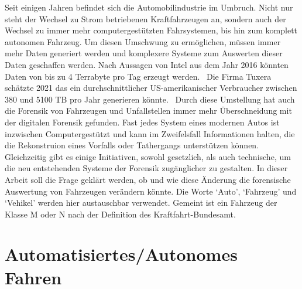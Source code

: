 \documentclass[conference,compsoc,final,a4paper]{IEEEtran}
\begin{document}
Seit einigen Jahren befindet sich die Automobilindustrie im Umbruch. Nicht nur steht der Wechsel zu Strom betriebenen Kraftfahrzeugen an,
sondern auch der Wechsel zu immer mehr computergestützten Fahrsystemen, bis hin zum komplett autonomen Fahrzeug.
Um diesen Umschwung zu ermöglichen, müssen immer mehr Daten generiert werden und komplexere Systeme zum Auswerten dieser Daten geschaffen werden.
Nach Aussagen von Intel aus dem Jahr 2016 könnten Daten von bis zu 4 Terrabyte pro Tag erzeugt werden.~\cite{Nelson2016}
Die Firma Tuxera schätzte 2021 das ein durchschnittlicher US-amerikanischer Verbraucher zwischen 380 und 5100 TB pro Jahr generieren könnte.~\cite{Wright2021}
Durch diese Umstellung hat auch die Forensik von Fahrzeugen und Unfallstellen immer mehr Überschneidung mit der digitalen Forensik gefunden.
Fast jedes System eines modernen Autos ist inzwischen Computergestützt und kann im Zweifelsfall Informationen halten, die die Rekonstruion eines Vorfalls oder Tathergangs unterstützen können.
Gleichzeitig gibt es einige Initiativen, sowohl gesetzlich\cite{Boehm2020}, als auch technische\cite{Hoque_2021a}\cite{Lee_2019}, um die neu entstehenden Systeme der Forensik zugänglicher zu gestalten.
In dieser Arbeit soll die Frage geklärt werden, ob und wie diese Änderung die forensische Auswertung von Fahrzeugen verändern könnte.
Die Worte `Auto', `Fahrzeug' und `Vehikel' werden hier austauschbar verwendet. Gemeint ist ein Fahrzeug der Klasse M oder N nach der Definition des Kraftfahrt-Bundesamt.

\section{Automatisiertes/Autonomes Fahren}
\end{document}
